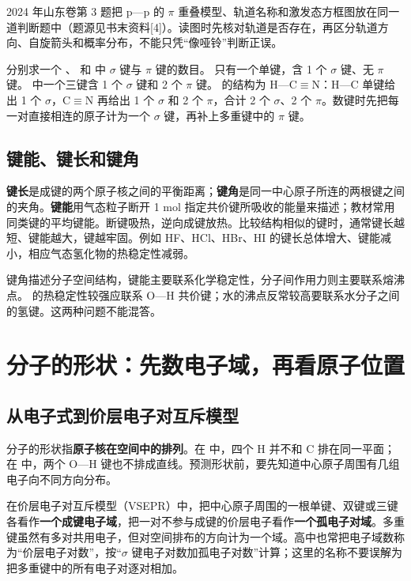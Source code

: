 2024 年山东卷第 3 题把 p—p 的 $\pi$ 重叠模型、轨道名称和激发态方框图放在同一道判断题中（题源见书末资料[4]）。读图时先核对轨道是否存在，再区分轨道方向、自旋箭头和概率分布，不能只凭“像哑铃”判断正误。

\begin{liti}[从结构式数键]
分别求一个 、 和  中 $\sigma$ 键与 $\pi$ 键的数目。
\tcblower
\jie {} 只有一个单键，含 1 个 $\sigma$ 键、无 $\pi$ 键。 中一个三键含 1 个 $\sigma$ 键和 2 个 $\pi$ 键。 的结构为 H—C$\equiv$N：H—C 单键给出 1 个 $\sigma$，C$\equiv$N 再给出 1 个 $\sigma$ 和 2 个 $\pi$，合计 2 个 $\sigma$、2 个 $\pi$。数键时先把每一对直接相连的原子计为一个 $\sigma$ 键，再补上多重键中的 $\pi$ 键。
\end{liti}

\subsection{键能、键长和键角}
\textbf{键长}是成键的两个原子核之间的平衡距离；\textbf{键角}是同一中心原子所连的两根键之间的夹角。\textbf{键能}用气态粒子断开 1 mol 指定共价键所吸收的能量来描述；教材常用同类键的平均键能。断键吸热，逆向成键放热。比较结构相似的键时，通常键长越短、键能越大，键越牢固。例如 HF、HCl、HBr、HI 的键长总体增大、键能减小，相应气态氢化物的热稳定性减弱。

键角描述分子空间结构，键能主要联系化学稳定性，分子间作用力则主要联系熔沸点。 的热稳定性较强应联系 O—H 共价键；水的沸点反常较高要联系水分子之间的氢键。这两种问题不能混答。

\section{分子的形状：先数电子域，再看原子位置}

\subsection{从电子式到价层电子对互斥模型}
分子的形状指\textbf{原子核在空间中的排列}。在  中，四个 H 并不和 C 排在同一平面；在  中，两个 O—H 键也不排成直线。预测形状前，要先知道中心原子周围有几组电子向不同方向分布。

在价层电子对互斥模型（VSEPR）中，把中心原子周围的一根单键、双键或三键各看作\textbf{一个成键电子域}，把一对不参与成键的价层电子看作\textbf{一个孤电子对域}。多重键虽然有多对共用电子，但对空间排布的方向计为一个域。高中也常把电子域数称为“价层电子对数”，按“$\sigma$ 键电子对数加孤电子对数”计算；这里的名称不要误解为把多重键中的所有电子对逐对相加。

